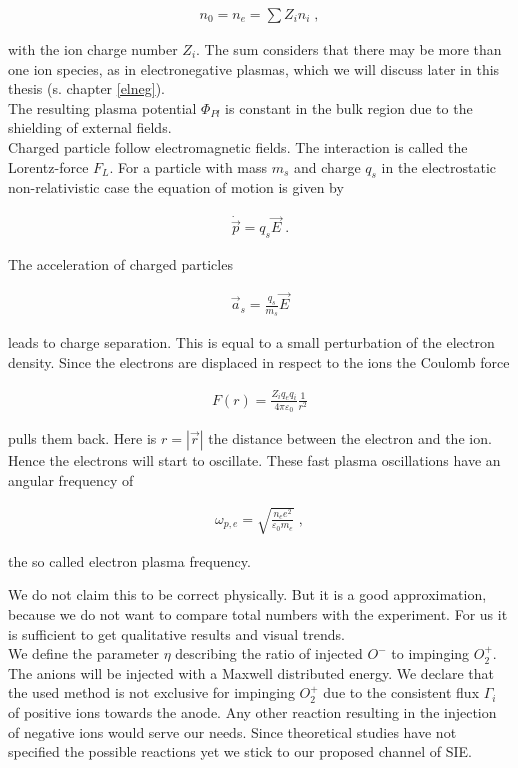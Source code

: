 \begin{align}
    n_0 = n_e =\sum Z_i n_i \; ,
\end{align}

with the ion charge number $Z_i$. The sum considers that there may be more than one ion species, as in electronegative plasmas, which we will discuss later in this thesis (s. chapter \ref{elneg}).\\
The resulting plasma potential $\Phi_{Pl}$ is constant in the bulk region due to the shielding of external fields. \\
Charged particle follow electromagnetic fields. The interaction is called the Lorentz-force $F_L$. 
For a particle with mass $m_s$ and charge $q_s$ in the electrostatic non-relativistic case the equation of motion is given by

\begin{align}
    \dot{\vec{p}}=q_s \vec{E}  \; .
\end{align}

The acceleration of charged particles

\begin{align}
    \vec{a}_s = \frac{q_s}{m_s} \vec{E}
\end{align}

leads to charge separation. This is equal to a small perturbation of the electron density. 
Since the electrons are displaced in respect to the ions the Coulomb force

\begin{align}
    F(r) = \frac{Z_i q_e q_i}{4 \pi \varepsilon_0} \frac{1}{r^2}
\end{align}

pulls them back. Here is $r=|\vec{r}|$ the distance between the electron and the ion. 
Hence the electrons will start to oscillate.
These fast plasma oscillations have an angular frequency of

\begin{align}
    \omega_{p,e} = \sqrt{\frac{n_e e^2}{\varepsilon_0 m_e}} \; ,
\end{align}

the so called electron plasma frequency.

We do not claim this to  be correct physically.
But it is a good approximation, because we do not want to compare total numbers with the experiment.
For us it is sufficient to get qualitative results and visual trends.\\
We define the parameter $\eta$ describing the ratio of injected $O^-$ to impinging $O^+_2$.
The anions will be injected with a Maxwell distributed energy. 
We declare that the used method is not exclusive for impinging $O_2^+$ due to the consistent flux $\Gamma_i$ of positive ions towards the anode.
Any other reaction resulting in the injection of negative ions would serve our needs.
Since theoretical studies have not specified the possible reactions yet we stick to our proposed channel of SIE.



